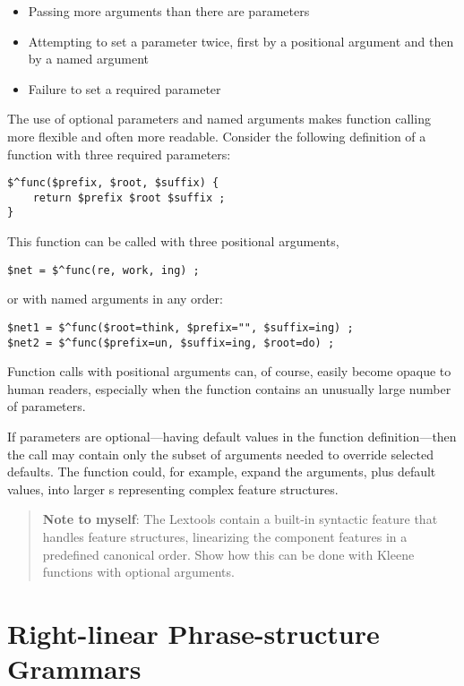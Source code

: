 \begin{itemize}
\item
Passing more arguments than there are parameters
\item
Attempting to set a parameter twice, first by a positional argument and
then by a named argument
\item
Failure to set a required parameter
\end{itemize}

The use of optional parameters and named arguments makes function calling more flexible and
often more readable.  Consider the following definition of a function
with three required parameters:

\begin{Verbatim}
$^func($prefix, $root, $suffix) {
	return $prefix $root $suffix ;
}
\end{Verbatim}

\noindent
This function can be called with three positional arguments,

\begin{Verbatim}
$net = $^func(re, work, ing) ;
\end{Verbatim}

\noindent
or with named arguments in any order:

\begin{Verbatim}
$net1 = $^func($root=think, $prefix="", $suffix=ing) ;
$net2 = $^func($prefix=un, $suffix=ing, $root=do) ;
\end{Verbatim}

\noindent
Function calls with positional arguments can, of course, easily become
opaque to human readers, especially when the function contains an unusually large number of parameters.

If parameters are optional---having default values in the function definition---then the call
may contain only the subset of arguments needed to override selected
defaults.  The function could, for example, expand the arguments, plus default
values, into larger \fsm{}s representing complex feature structures.

\begin{quote}
\textbf{Note to myself}: The  Lextools contain a
built-in syntactic
feature that handles feature structures, linearizing
the component features in a predefined canonical order.  Show how this
can be done with Kleene functions with optional arguments.
\end{quote}

\section{Right-linear Phrase-structure Grammars}

